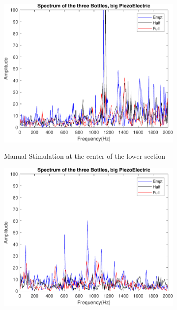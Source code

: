 \begin{figure}[]
    \centering
    \begin{subfigure}{0.45\textwidth}
        \centering
        \includegraphics[width=\linewidth]{Chapters/6CHP/Figures/ResultsSensors/PiezBMaBot.pdf}
        \caption{Manual Stimulation at the center of the lower section}{}
        \label{subfig:ResPiezBMaBot}
    \end{subfigure}
    \begin{subfigure}{0.45\textwidth}
        \centering
        \includegraphics[width=\linewidth]{Chapters/6CHP/Figures/ResultsSensors/PiezBAuBot.pdf}

\end{subfigure}
\end{figure}
